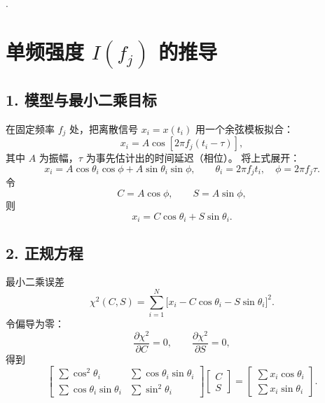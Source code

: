 \documentclass[withoutpreface,bwprint]{cumcmthesis}
\begin{document}
.



\section*{单频强度 $I(f_j)$ 的推导}

\subsection*{1. 模型与最小二乘目标}
在固定频率 $f_j$ 处，把离散信号 $x_i=x(t_i)$ 用一个余弦模板拟合：
%
\begin{equation}
x_i=A\cos[2\pi f_j(t_i-\tau)],
\end{equation}
%
其中 $A$ 为振幅，$\tau$ 为事先估计出的时间延迟（相位）。  
将上式展开：
%
\begin{equation}
x_i=A\cos\theta_i\cos\phi+A\sin\theta_i\sin\phi,
\qquad
\theta_i=2\pi f_j t_i,\quad \phi=2\pi f_j\tau.
\end{equation}
%
令
%
\begin{equation}
C=A\cos\phi,\qquad S=A\sin\phi,
\end{equation}
%
则
%
\begin{equation}
x_i=C\cos\theta_i+S\sin\theta_i.
\end{equation}

\subsection*{2. 正规方程}
最小二乘误差
%
\begin{equation}
\chi^2(C,S)=\sum_{i=1}^{N}
\bigl[x_i-C\cos\theta_i-S\sin\theta_i\bigr]^2.
\end{equation}
%
令偏导为零：
%
\begin{equation}
\frac{\partial\chi^2}{\partial C}=0,\qquad
\frac{\partial\chi^2}{\partial S}=0,
\end{equation}
%
得到
%
\begin{equation}
\begin{bmatrix}
\sum\cos^2\theta_i & \sum\cos\theta_i\sin\theta_i\\[4pt]
\sum\cos\theta_i\sin\theta_i & \sum\sin^2\theta_i
\end{bmatrix}
\begin{bmatrix}
C\\ S
\end{bmatrix}
=
\begin{bmatrix}
\sum x_i\cos\theta_i\\[4pt]
\sum x_i\sin\theta_i
\end{bmatrix}.
\end{equation}
\end{document}
